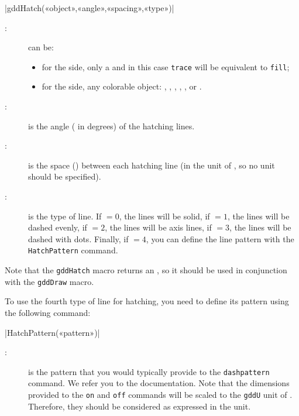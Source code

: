 \documentclass[a4paper,english]{article}
\begin{document}
\begin{colourband}
\macro|gddHatch(«object»,«angle»,«spacing»,«type»)|
\begin{description}
  \item[:] can be:
  \begin{itemize}
    \item for the \MP{} side, only a  and in this case \lstinline+trace+ will be equivalent to \lstinline+fill+;
    \item for the \mpgeomdd side,
  any colorable object: ,
   , , , , or
  .
  \end{itemize}
  \item[:] is the angle ( in degrees) of the hatching lines.
  \item[:] is the space () between each hatching line (in the unit of \mpgeomdd, so no unit should be specified).
  \item[:] is the type of line. If $=0$, the lines will be solid, if $=1$, the lines will be dashed evenly, if $=2$, the lines will be axis lines, if $=3$, the lines will be dashed with dots. Finally, if $=4$, you can define the line pattern with the \lstinline+HatchPattern+ command.
\end{description}
\end{colourband}

Note that the \lstinline+gddHatch+ macro returns an , so it should be
used in conjunction with the \lstinline+gddDraw+ macro.

To use the fourth type of line for hatching, you need to define its pattern using the following command:

\begin{colourband}
\macro|HatchPattern(«pattern»)|
\begin{description}
  \item[:] is the pattern that you would typically provide to the
  \lstinline+dashpattern+ command. We refer you to the \MP{} documentation. Note
  that the dimensions provided to the \lstinline+on+ and \lstinline+off+ commands
  will be scaled to the \lstinline+gddU+ unit of \mpgeomdd. Therefore, they should
  be considered as expressed in the \mpgeomdd unit.
\end{description}
\end{colourband}
\end{document}
